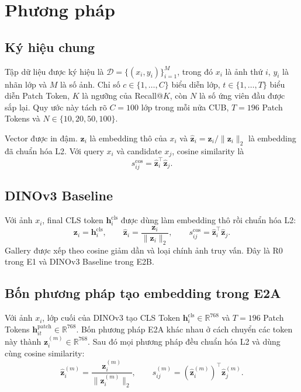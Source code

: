 \documentclass[11pt,a4paper]{article}
\begin{document}
\section{Phương pháp}
\subsection{Ký hiệu chung}
Tập dữ liệu được ký hiệu là
$\mathcal{D}=\{(x_i,y_i)\}_{i=1}^{M}$, trong đó $x_i$ là ảnh thứ $i$,
$y_i$ là nhãn lớp và $M$ là số ảnh. Chỉ số $c\in\{1,\ldots,C\}$ biểu diễn
lớp, $t\in\{1,\ldots,T\}$ biểu diễn Patch Token, $K$ là ngưỡng của
Recall@$K$, còn $N$ là số ứng viên đầu được sắp lại. Quy ước này tách rõ
$C=100$ lớp trong mỗi nửa CUB, $T=196$ Patch Tokens và
$N\in\{10,20,50,100\}$.

Vector được in đậm. $\mathbf z_i$ là embedding thô của $x_i$ và
$\widehat{\mathbf z}_i=\mathbf z_i/\lVert\mathbf z_i\rVert_2$ là embedding
đã chuẩn hóa L2. Với query $x_i$ và candidate $x_j$, cosine similarity là
\begin{equation}
 s^{\mathrm{cos}}_{ij}
 =\widehat{\mathbf z}_i^{\top}\widehat{\mathbf z}_j.
\end{equation}

\subsection{DINOv3 Baseline}
Với ảnh $x_i$, final CLS token $\mathbf h_i^{\mathrm{cls}}$ được dùng làm
embedding thô rồi chuẩn hóa L2:
\begin{equation}
 \mathbf z_i=\mathbf h_i^{\mathrm{cls}},\qquad
 \widehat{\mathbf z}_i=\frac{\mathbf z_i}{\lVert\mathbf z_i\rVert_2},
 \qquad s^{\mathrm{cos}}_{ij}
 =\widehat{\mathbf z}_i^\top\widehat{\mathbf z}_j.
\end{equation}
Gallery được xếp theo cosine giảm dần và loại chính ảnh truy vấn. Đây là R0
trong E1 và DINOv3 Baseline trong E2B.

\subsection{Bốn phương pháp tạo embedding trong E2A}
Với ảnh $x_i$, lớp cuối của DINOv3 tạo CLS Token
$\mathbf h_i^{\mathrm{cls}}\in\mathbb{R}^{768}$ và $T=196$ Patch Tokens
$\mathbf h_{it}^{\mathrm{patch}}\in\mathbb{R}^{768}$. Bốn phương pháp E2A
khác nhau ở cách chuyển các token này thành
$\mathbf z_i^{(m)}\in\mathbb{R}^{768}$. Sau đó mọi phương pháp
đều chuẩn hóa L2 và dùng cùng cosine similarity:
\begin{equation}
 \widehat{\mathbf z}_i^{(m)}
 =\frac{\mathbf z_i^{(m)}}{\lVert\mathbf z_i^{(m)}\rVert_2},
 \qquad s_{ij}^{(m)}
 =(\widehat{\mathbf z}_i^{(m)})^\top\widehat{\mathbf z}_j^{(m)}.
\end{equation}
\end{document}

